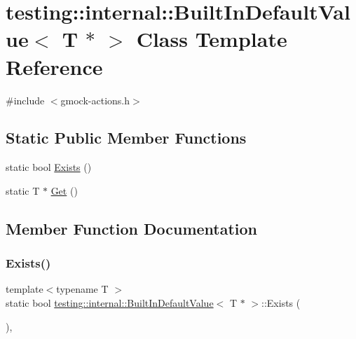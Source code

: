 \hypertarget{classtesting_1_1internal_1_1_built_in_default_value_3_01_t_01_5_01_4}{}\section{testing\+:\+:internal\+:\+:Built\+In\+Default\+Value$<$ T $\ast$ $>$ Class Template Reference}
\label{classtesting_1_1internal_1_1_built_in_default_value_3_01_t_01_5_01_4}


{\ttfamily \#include $<$gmock-\/actions.\+h$>$}

\subsection*{Static Public Member Functions}
\begin{DoxyCompactItemize}
\item 
static bool \hyperlink{classtesting_1_1internal_1_1_built_in_default_value_3_01_t_01_5_01_4_aafa7172f63d068305fb37d5db40bb543}{Exists} ()
\item 
static T $\ast$ \hyperlink{classtesting_1_1internal_1_1_built_in_default_value_3_01_t_01_5_01_4_adc2fa2bdae767589d171ae3a117e3a9f}{Get} ()
\end{DoxyCompactItemize}


\subsection{Member Function Documentation}
\mbox{\label{classtesting_1_1internal_1_1_built_in_default_value_3_01_t_01_5_01_4_aafa7172f63d068305fb37d5db40bb543}} 
\subsubsection{\texorpdfstring{Exists()}{Exists()}}
{\footnotesize\ttfamily template$<$typename T $>$ \\
static bool \hyperlink{classtesting_1_1internal_1_1_built_in_default_value}{testing\+::internal\+::\+Built\+In\+Default\+Value}$<$ T $\ast$ $>$\+::Exists (\begin{DoxyParamCaption}{ }\end{DoxyParamCaption})\hspace{0.3cm}{\ttfamily [inline]}, {\ttfamily [static]}}

